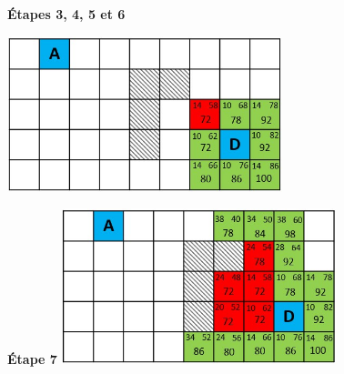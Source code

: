 \begin{multicols}{2}

\begin{center}

\textbf{\'Etapes 3, 4, 5 et 6}

\includegraphics[width=8cm]{images/quadri4.jpg}
\end{center}

\begin{center}
\textbf{\'Etape 7}
\includegraphics[width=8cm]{images/quadri9.jpg}
\end{center}
\end{multicols}


